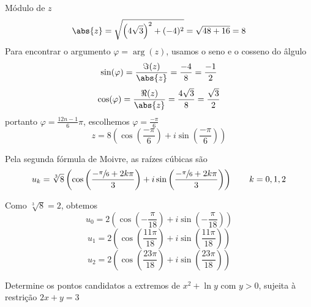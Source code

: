 \documentclass[a4paper,12pt,fleqn]{article}
\begin{document}
\begin{answer}
Módulo de $z$
\[
    \abs{z}
    = \sqrt{\left(4\sqrt{3}\right)^2+(-4)^2}
    = \sqrt{48+16}
    = 8
\]
Para encontrar o argumento \(\varphi = \arg(z)\),
usamos o seno e o cosseno do âlgulo
\[
    \sin(\varphi)
    = \frac{\Im(z)}{\abs{z}}
    = \frac{-4}{8}
    = \frac{-1}{2}
\]
\[
    \cos(\varphi)
    = \frac{\Re(z)}{\abs{z}}
    = \frac{4\sqrt{3}}{8}
    = \frac{\sqrt{3}}{2}
\]
portanto \(\varphi=\frac{12n -1}{6}\pi\), escolhemos \(\varphi=\frac{-\pi}{6}\)
\[
    z = 8
    \left(
        \cos\left(\frac{-\pi}{6}\right) +
        i\sin\left(\frac{-\pi}{6}\right)
    \right)
\]

Pela segunda fórmula de Moivre, as raízes cúbicas são
\[
    u_k=\sqrt[3]{8}
    \left(
          \cos\left(\frac{-\sfrac{\pi}{6}+2k\pi}{3}\right)
        +i\sin\left(\frac{-\sfrac{\pi}{6}+2k\pi}{3}\right)
    \right)
    \qquad k = 0, 1, 2
\]

Como $\sqrt[3]{8}=2$, obtemos
\[
    u_0 = 2 \left(
                \cos\left(-\frac{\pi}{18}\right)
                +i\sin\left(-\frac{\pi}{18}\right)
            \right)
\]
\[
    u_1 = 2 \left(
                \cos\left(\frac{11\pi}{18}\right)
                +i\sin\left(\frac{11\pi}{18}\right)
            \right)
\]
\[
    u_2 = 2 \left(
                \cos\left(\frac{23\pi}{18}\right)
                +i\sin\left(\frac{23\pi}{18}\right)
            \right)
\]
\end{answer}


Determine os pontos candidatos a extremos de
\(
    x^2 + \ln y
\)
com $y>0$, sujeita à restrição
\(
    2x + y = 3
\)
\end{document}
